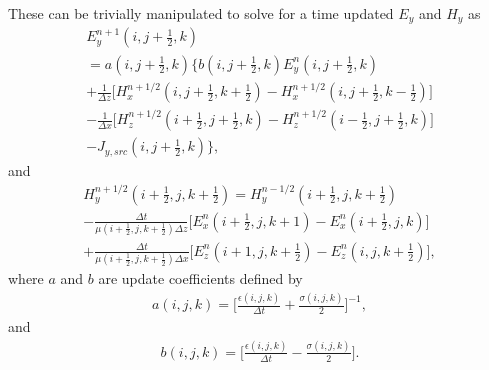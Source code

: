These can be trivially manipulated to solve for a time updated $E_y$ and $H_y$ as
\begin{multline}
	E_y^{n+1}(i,j+\tfrac{1}{2},k)\\ 
	=a(i,j+\tfrac{1}{2},k) \bigg\{b(i,j+\tfrac{1}{2},k)E_y^{n}(i,j+\tfrac{1}{2},k) \\
	 +\frac{1}{\Delta z}\bigg[H_x^{n+1/2}(i,j+\tfrac{1}{2},k+\tfrac{1}{2})-H_x^{n+1/2}(i,j+\tfrac{1}{2},k-\tfrac{1}{2}) \bigg] \\
	 -\frac{1}{\Delta x} \bigg[H_z^{n+1/2}(i+\tfrac{1}{2},j+\tfrac{1}{2},k)-H_z^{n+1/2}(i-\tfrac{1}{2},j+\tfrac{1}{2},k)\bigg] \\
	 -J_{y,src}(i,j+\tfrac{1}{2},k)
	 \bigg\},
	\label{eq:ey-update}
\end{multline}
and
\begin{multline}
	H_y^{n+1/2}(i+\tfrac{1}{2},j,k+\tfrac{1}{2}) = H_y^{n-1/2}(i+\tfrac{1}{2},j,k+\tfrac{1}{2}) \\ 
	-\frac{\Delta t}{\mu(i+\tfrac{1}{2},j,k+\tfrac{1}{2})\Delta z}\bigg[E_x^n(i+\tfrac{1}{2},j,k+1)-E_x^n(i+\tfrac{1}{2},j,k)\bigg] \\
	+\frac{\Delta t}{\mu(i+\tfrac{1}{2},j,k+\tfrac{1}{2})\Delta x}\bigg[E_z^n(i+1,j,k+\tfrac{1}{2})-E_z^n(i,j,k+\tfrac{1}{2})\bigg],
	\label{eq:hy-update}
\end{multline}
where $a$ and $b$ are update coefficients defined by
\begin{align}
	a(i,j,k) = \bigg[\frac{\epsilon(i,j,k)}{\Delta t}+\frac{\sigma(i,j,k)}{2}\bigg]^{-1},
	\label{eq:a}
\end{align}
and
\begin{align}
	b(i,j,k) = \bigg[\frac{\epsilon(i,j,k)}{\Delta t}-\frac{\sigma(i,j,k)}{2}\bigg].
	\label{eq:b}
\end{align}

